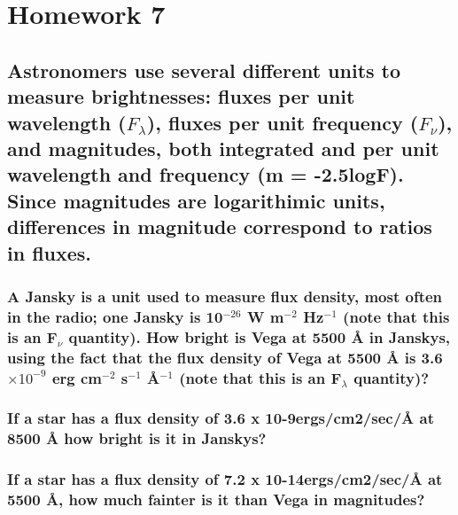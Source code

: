 \documentclass[12pt]{article}
\begin{document}
%

\section*{Homework 7}
\date{01/29/2016}
\subsection*{Astronomers use several different units to measure
brightnesses: fluxes per unit wavelength ($F_{\lambda}$),
fluxes per unit frequency ($F_{\nu}$), and magnitudes, both
integrated and per unit wavelength and frequency (m = -2.5logF).
Since magnitudes are logarithimic units, differences in magnitude
correspond to ratios in fluxes.}

\subsubsection{A Jansky is a unit used to measure flux density,
most often in the radio; one Jansky is 10$^{-26}$ W m$^{-2}$ Hz$^{-1}$
(note that this is an F$_{\nu}$ quantity).
How bright is Vega at 5500 \AA{} in Janskys, using the fact that the
flux density of Vega at 5500 \AA{}
is 3.6 $\times 10^{-9}$ erg cm$^{-2}$ s$^{-1}$ \AA{}$^{-1}$
(note that this is an F$_{\lambda}$ quantity)?}

\subsubsection{If a star has a flux density of 3.6 x
10-9ergs/cm2/sec/\AA{} at
8500 \AA{} how bright is it in Janskys?}

\subsubsection{If a star has a flux density of 7.2 x
10-14ergs/cm2/sec/\AA{} at 5500 \AA{}, how much fainter is it
than Vega in magnitudes? }


%
\end{document}
